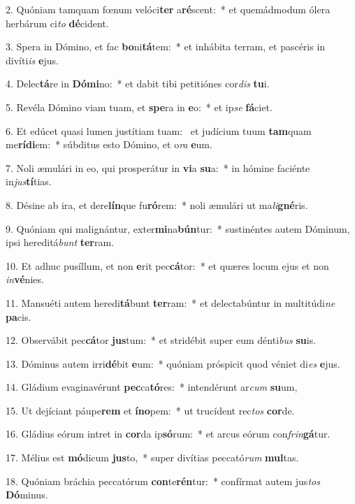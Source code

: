 2. Quóniam tamquam fœnum velóci\textbf{ter} a\textbf{ré}scent:~*  et quemádmodum ólera herbárum ci\textit{to} \textbf{dé}cident.\

3. Spera in Dómino, et fac \textbf{bo}ni\textbf{tá}tem:~*  et inhábita terram, et pascéris in divíti\textit{is} \textbf{e}jus.\

4. Delec\textbf{tá}re in \textbf{Dó}\textbf{mi}no:~*  et dabit tibi petitiónes cor\textit{dis} \textbf{tu}i.\

5. Revéla Dómino viam tuam, et \textbf{spe}ra in \textbf{e}o:~*  et ip\textit{se} \textbf{fá}ciet.\

6. Et edúcet quasi lumen justítiam tuam: \dag\  et judícium tuum \textbf{tam}quam me\textbf{rí}\textbf{di}em:~*  súbditus esto Dómino, et o\textit{ra} \textbf{e}um.\

7. Noli æmulári in eo, qui prosperátur in \textbf{vi}a \textbf{su}a:~*  in hómine faciénte in\textit{jus}\textbf{tí}tias.\

8. Désine ab ira, et dere\textbf{lín}que fu\textbf{ró}rem:~*  noli æmulári ut ma\textit{li}\textbf{gné}ris.\

9. Quóniam qui malignántur, exter\textbf{mi}na\textbf{bún}tur:~*  sustinéntes autem Dóminum, ipsi hereditá\textit{bunt} \textbf{ter}ram.\

10. Et adhuc pusíllum, et non \textbf{e}rit pec\textbf{cá}tor:~*  et quæres locum ejus et non \textit{in}\textbf{vé}nies.\

11. Mansuéti autem heredi\textbf{tá}bunt \textbf{ter}ram:~*  et delectabúntur in multitúdi\textit{ne} \textbf{pa}cis.\

12. Observábit pec\textbf{cá}tor \textbf{jus}tum:~*  et stridébit super eum dénti\textit{bus} \textbf{su}is.\

13. Dóminus autem irri\textbf{dé}bit \textbf{e}um:~*  quóniam próspicit quod véniet di\textit{es} \textbf{e}jus.\

14. Gládium evaginavérunt \textbf{pec}ca\textbf{tó}res:~*  intendérunt ar\textit{cum} \textbf{su}um,\

15. Ut dejíciant páupe\textbf{rem} et \textbf{ín}\textbf{o}pem:~*  ut trucídent rec\textit{tos} \textbf{cor}de.\

16. Gládius eórum intret in \textbf{cor}da ip\textbf{só}rum:~*  et arcus eórum con\textit{frin}\textbf{gá}tur.\

17. Mélius est \textbf{mó}dicum \textbf{jus}to,~*  super divítias peccató\textit{rum} \textbf{mul}tas.\

18. Quóniam bráchia peccatórum \textbf{con}te\textbf{rén}tur:~*  confírmat autem jus\textit{tos} \textbf{Dó}minus.\

